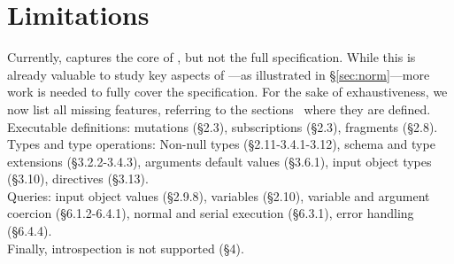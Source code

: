 \section{Limitations}\label{sec:limitations}

Currently, \gcoql captures the core of \gql, but not the full specification. While this is already valuable to study key aspects of \gql---as illustrated in \S\ref{sec:norm}---more work is needed to fully cover the specification. 
For the sake of exhaustiveness, we now list all missing features, referring to the \spec sections~\cite{gqlspec} where they are defined.\\
Executable definitions:
mutations (\S2.3), subscriptions (\S2.3), fragments (\S2.8).\\
Types and type operations: Non-null types (\S2.11-3.4.1-3.12), schema and type extensions (\S3.2.2-3.4.3), arguments default values (\S3.6.1), input object types (\S3.10), directives (\S3.13).\\
Queries: input object values (\S2.9.8), variables (\S2.10), variable and argument coercion (\S6.1.2-6.4.1), normal and serial execution (\S6.3.1), error handling (\S6.4.4).\\
Finally, introspection is not supported (\S4). 




